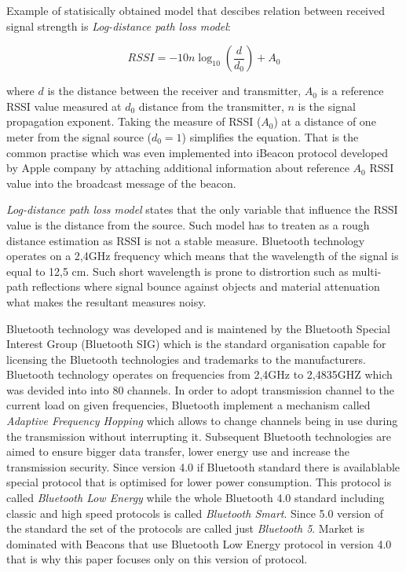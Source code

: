 \documentclass[../main.tex]{subfiles}
\begin{document}
Example of statisically obtained model that descibes relation between received signal strength is \textit{Log-distance path loss model}:

\begin{equation}
\label{eq:log-distance-model}
	RSSI = -10 n \log_{10} (\frac{d}{d_0}) + A_0
\end{equation}



where $ d $ is the distance between the receiver and transmitter, $A_0$ is a reference RSSI value measured at $d_0$ distance from the transmitter, $n$ is the signal propagation exponent. Taking the measure of RSSI ($A_0$) at a distance of one meter from the signal source ($d_0 = 1$) simplifies the equation. That is the common practise which was even implemented into iBeacon protocol developed by Apple company by attaching additional information about reference $A_0$ RSSI value into the broadcast message of the beacon.

\textit{Log-distance path loss model} states that the only variable that influence the RSSI value is the distance from the source. Such model has to treaten as a rough distance estimation as RSSI is not a stable measure. Bluetooth technology operates on a 2,4GHz frequency which means that the wavelength of the signal is equal to 12,5 cm. Such short wavelength is prone to distrortion such as multi-path reflections where signal bounce against objects and material attenuation what makes the resultant measures noisy\cite{RSSI_path_loss_prediction_model}.

Bluetooth technology was developed and is maintened by the Bluetooth Special Interest Group (Bluetooth SIG) which is the standard organisation capable for licensing the Bluetooth technologies and trademarks to the manufacturers. Bluetooth technology operates on frequencies from 2,4GHz to 2,4835GHZ which was devided into into 80 channels. In order to adopt transmission channel to the current load on given frequencies, Bluetooth implement a mechanism called \textit{Adaptive Frequency Hopping} which allows to change channels being in use during the transmission without interrupting it. Subsequent Bluetooth technologies are aimed to ensure bigger data transfer, lower energy use and increase the transmission security. Since version 4.0 if Bluetooth standard there is availablable special protocol that is optimised for lower power consumption. This protocol is called \textit{Bluetooth Low Energy} while the whole Bluetooth 4.0 standard including classic and high speed protocols is called \textit{Bluetooth Smart}. Since 5.0 version of the standard the set of the protocols are called just \textit{Bluetooth 5}. Market is dominated with Beacons that use Bluetooth Low Energy protocol in version 4.0 that is why this paper focuses only on this version of protocol.
\end{document}
